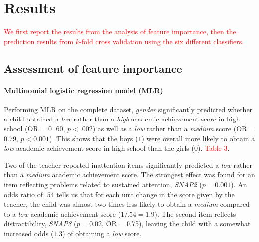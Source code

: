 \documentclass[10pt,letterpaper]{article}
\begin{document}
{{\section*{Results}

\textcolor{red}{We first report the results from the analysis of feature importance, then the prediction results from $k$-fold cross validation using the six different classifiers.}

\subsection*{Assessment of feature importance} 


\paragraph{Multinomial logistic regression model (MLR)}


Performing MLR on the complete dataset, {\it gender} significantly predicted whether a child obtained a {\it low} rather than a {\it high} academic achievement score in high school (OR = 0 .60, $p < .002$) as well as a {\it low} rather than a {\it medium} score (OR = $0.79$, $p < 0.001$). This shows that the boys ($1$) were overall more likely to obtain a {\it low} academic achievement score in high school than the girls ($0$). \textcolor{red}{Table 3}. 

Two of the teacher reported inattention items significantly predicted a {\it low} rather than a {\it medium} academic achievement score. The strongest effect was found for an item reflecting problems related to sustained attention, {\it SNAP2} ($p = 0.001$). An odds ratio of $.54$ tells us that for each unit change in the score given by the teacher, the child was almost two times less likely to obtain a {\it medium} compared to a {\it low} academic achievement score ($1/.54 = 1.9$). The second item reflects distractibility, {\it SNAP8} ($p = 0.02$, OR = 0.75), leaving the child with a somewhat increased odds ($1.3$) of obtaining a {\it low} score.  


}}
\end{document}
